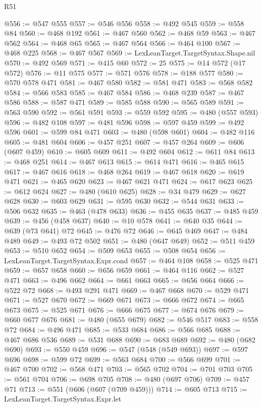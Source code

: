 \begin{lexlean}{R51}
\begin{coremodule}
@556 := @547 @555
@557 := @546 @556
@558 := @492 @545
@559 := @558 @84
@560 := @468 @192
@561 := @467 @560
@562 := @468 @59
@563 := @467 @562
@564 := @468 @65
@565 := @467 @564
@566 := @464 @100
@567 := @468 @225
@568 := @467 @567
@569 := LexLeanTarget.TargetSyntax.Shape.nil
@570 := @492 @569
@571 := @415 @60
@572 := 25
@575 := @14 @572 (@17 @572)
@576 := @11 @575
@577 := @571 @576
@578 := @188 @577
@580 := @570 @578 @471
@581 := @467 @580
@582 := @581 @471
@583 := @568 @582
@584 := @566 @583
@585 := @467 @584
@586 := @468 @239
@587 := @467 @586
@588 := @587 @471
@589 := @585 @588
@590 := @565 @589
@591 := @563 @590
@592 := @561 @591
@593 := @559 @592
@595 := @480 (@557 @593)
@596 := @482 @108
@597 := @481 @596
@598 := @597 @459
@599 := @492 @596
@601 := @599 @84 @471
@603 := @480 (@598 @601)
@604 := @482 @116
@605 := @481 @604
@606 := @457 @251
@607 := @457 @264
@609 := @606 (@607 @459)
@610 := @605 @609
@611 := @492 @604
@612 := @611 @84
@613 := @468 @251
@614 := @467 @613
@615 := @614 @471
@616 := @465 @615
@617 := @467 @616
@618 := @468 @264
@619 := @467 @618
@620 := @619 @471
@621 := @465 @620
@623 := @467 @621 @471
@624 := @617 @623
@625 := @612 @624
@627 := @480 (@610 @625)
@628 := @34 @479
@629 := @627 @628
@630 := @603 @629
@631 := @595 @630
@632 := @544 @631
@633 := @506 @632
@635 := @463 (@478 @633)
@636 := @455 @635
@637 := @485 @459
@639 := @456 (@458 @637)
@640 := @10 @578
@641 := @640 @35
@644 := @639 (@73 @641) @72
@645 := @476 @72
@646 := @645 @469
@647 := @484 @489
@649 := @493 @72 @502
@651 := @480 (@647 @649)
@652 := @511 @459
@653 := @510 @652
@654 := @509 @653
@655 := @508 @654
@656 := LexLeanTarget.TargetSyntax.Expr.cond
@657 := @464 @108
@658 := @525 @471
@659 := @657 @658
@660 := @656 @659
@661 := @464 @116
@662 := @527 @471
@663 := @496 @662
@664 := @661 @663
@665 := @656 @664
@666 := @522 @72
@668 := @493 @291 @471
@669 := @467 @668
@670 := @529 @471
@671 := @527 @670
@672 := @669 @671
@673 := @666 @672
@674 := @665 @673
@675 := @525 @671
@676 := @666 @675
@677 := @674 @676
@679 := @660 @677 @676
@681 := @480 (@655 @679)
@682 := @546 @517
@683 := @558 @72
@684 := @496 @471
@685 := @533 @684
@686 := @566 @685
@688 := @467 @686 @536
@689 := @531 @688
@690 := @683 @689
@692 := @480 (@682 @690)
@693 := @550 @459
@696 := @547 (@548 (@549 @693))
@697 := @597 @696
@698 := @599 @72
@699 := @563 @684
@700 := @566 @699
@701 := @467 @700
@702 := @568 @471
@703 := @565 @702
@704 := @701 @703
@705 := @561 @704
@706 := @698 @705
@708 := @480 (@697 @706)
@709 := @457 @71
@713 := @551 (@606 (@607 (@709 @459)))
@714 := @605 @713
@715 := LexLeanTarget.TargetSyntax.Expr.let

\end{coremodule}
\end{lexlean}
